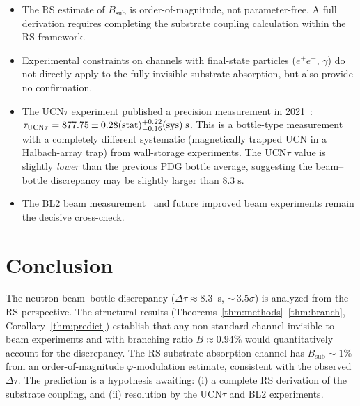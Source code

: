 \documentclass[12pt,a4paper]{article}
\theoremstyle{definition}
\theoremstyle{remark}
\begin{document}
\begin{itemize}
  \item The RS estimate of $B_{\mathrm{sub}}$ is order-of-magnitude, not
  parameter-free.  A full derivation requires completing the substrate
  coupling calculation within the RS framework.
  \item Experimental constraints on channels with final-state particles
  ($e^+e^-$, $\gamma$) do not directly apply to the fully invisible
  substrate absorption, but also provide no confirmation.
  \item The UCN$\tau$ experiment published a precision measurement in
  2021~\cite{Gonzalez2021}: $\tau_{\mathrm{UCN\tau}} = 877.75 \pm 0.28
  ({\rm stat}) ^{+0.22}_{-0.16}({\rm sys})\;\mathrm{s}$.  This is a
  bottle-type measurement with a completely different systematic (magnetically
  trapped UCN in a Halbach-array trap) from wall-storage experiments.  The
  UCN$\tau$ value is slightly \emph{lower} than the previous PDG bottle
  average, suggesting the beam--bottle discrepancy may be slightly larger
  than $8.3\;\mathrm{s}$.
  \item The BL2 beam measurement~\cite{PDG} and future improved beam
  experiments remain the decisive cross-check.
\end{itemize}

\section{Conclusion}
\label{sec:conclusion}

The neutron beam--bottle discrepancy ($\Delta\tau \approx 8.3$~s,
${\sim}\,3.5\sigma$) is analyzed from the RS perspective.  The
structural results (Theorems~\ref{thm:methods}--\ref{thm:branch}, Corollary~\ref{thm:predict})
establish that any non-standard channel invisible to beam experiments
and with branching ratio $B \approx 0.94\%$ would quantitatively
account for the discrepancy.  The RS substrate absorption channel has
$B_{\mathrm{sub}} \sim 1\%$ from an order-of-magnitude $\varphi$-modulation
estimate, consistent with the observed $\Delta\tau$.  The prediction
is a hypothesis awaiting: (i) a complete RS derivation of the substrate
coupling, and (ii) resolution by the UCN$\tau$ and BL2 experiments.
\end{document}
